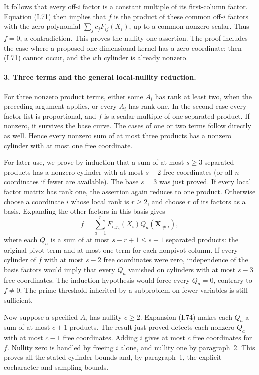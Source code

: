\documentclass[11pt,a4paper]{article}
\theoremstyle{definition}\newtheorem{definition}{Definition}
\begin{document}
It follows that every off-$i$ factor is a constant multiple
of its first-column factor. Equation (I.71) then implies that
$f$ is the product of these common off-$i$ factors with the
zero polynomial $\sum_jc_jF_{ij}(X_i)$, up to a common
nonzero scalar. Thus $f=0$, a contradiction. This proves
the nullity-one assertion. The proof includes the case where
a proposed one-dimensional kernel has a zero coordinate:
then (I.71) cannot occur, and the $i$th cylinder is already
nonzero.

\paragraph{3. Three terms and the general local-nullity reduction.}
For three nonzero product terms, either some $A_i$ has rank
at least two, when the preceding argument applies, or every
$A_i$ has rank one. In the second case every factor list is
proportional, and $f$ is a scalar multiple of one separated
product. If nonzero, it survives the base curve. The cases
of one or two terms follow directly as well. Hence every
nonzero sum of at most three products has a nonzero cylinder
with at most one free coordinate.

For later use, we prove by induction that a sum of at most
$s\ge3$ separated products has a nonzero cylinder with at
most $s-2$ free coordinates (or all $n$ coordinates if fewer
are available). The base $s=3$ was just proved. If every
local factor matrix has rank one, the assertion again
reduces to one product. Otherwise choose a coordinate $i$
whose local rank is $r\ge2$, and choose $r$ of its factors
as a basis. Expanding the other factors in this basis gives
\[
 f=\sum_{a=1}^r F_{i,j_a}(X_i)Q_a(\mathbf X_{\ne i}),
 \tag{I.74}
\]
where each $Q_a$ is a sum of at most $s-r+1\le s-1$
separated products: the original pivot term and at most one
term for each nonpivot column. If every cylinder of $f$
with at most $s-2$ free coordinates were zero, independence
of the basis factors would imply that every $Q_a$ vanished
on cylinders with at most $s-3$ free coordinates. The
induction hypothesis would force every $Q_a=0$, contrary
to $f\ne0$. The prime threshold inherited by a subproblem
on fewer variables is still sufficient.

Now suppose a specified $A_i$ has nullity $c\ge2$.
Expansion (I.74) makes each $Q_a$ a sum of at most $c+1$
products. The result just proved detects each nonzero $Q_a$
with at most $c-1$ free coordinates. Adding $i$ gives at
most $c$ free coordinates for $f$. Nullity zero is handled
by freeing $i$ alone, and nullity one by paragraph~2. This
proves all the stated cylinder bounds and, by paragraph~1,
the explicit cocharacter and sampling bounds.
\end{document}
